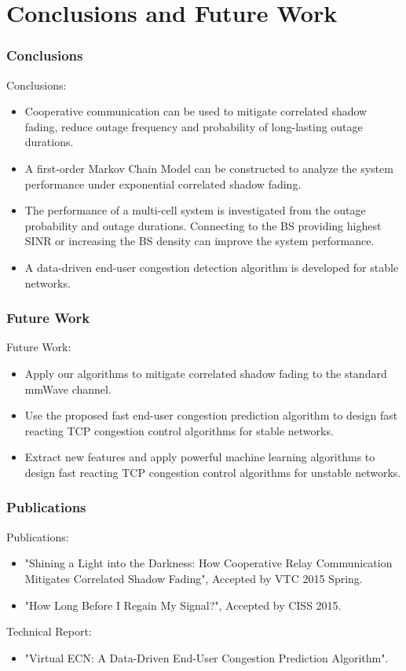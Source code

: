 \documentclass{beamer}
\begin{document}
\section{Conclusions and Future Work}
\begin{frame}
\frametitle{Conclusions}
Conclusions:
\begin{itemize}

\item Cooperative communication can be used to mitigate correlated shadow fading, reduce outage frequency and probability of long-lasting outage durations. 
\item A first-order Markov Chain Model can be constructed to analyze the system performance under exponential correlated shadow fading.
\item The performance of a multi-cell system is investigated from the outage probability and outage durations. Connecting to the BS providing highest SINR or increasing the BS density can improve the system performance.
\item A data-driven end-user congestion detection algorithm is developed for stable networks.
\end{itemize}
\end{frame}
\begin{frame}
\frametitle{Future Work}
Future Work:
\begin{itemize}
\item Apply our algorithms to mitigate correlated shadow fading to the standard mmWave channel.
\item Use the proposed fast end-user congestion prediction algorithm to design fast reacting TCP congestion control algorithms for stable networks.
\item Extract new features and apply powerful machine learning algorithms to design fast reacting TCP congestion control algorithms for unstable networks.
\end{itemize}
\end{frame}
\begin{frame}
\frametitle{Publications}
Publications:
\begin{itemize}
\item "Shining a Light into the Darkness: How Cooperative Relay Communication Mitigates Correlated Shadow Fading", Accepted by VTC 2015 Spring.
\item "How Long Before I Regain My Signal?", Accepted by CISS 2015.
\end{itemize}
Technical Report:
\begin{itemize}
\item "Virtual ECN: A Data-Driven End-User Congestion Prediction Algorithm".
\end{itemize}
\end{frame}
\end{document}
